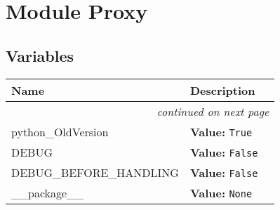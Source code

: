 %
%
%


\section{Module Proxy}

    \label{Proxy}


  \subsection{Variables}

    \vspace{-1cm}
\hspace{\varindent}\begin{longtable}{|p{\varnamewidth}|p{\vardescrwidth}|l}
\cline{1-2}
\cline{1-2} \centering \textbf{Name} & \centering \textbf{Description}& \\
\cline{1-2}
\endhead\cline{1-2}\multicolumn{3}{r}{\small\textit{continued on next page}}\\\endfoot\cline{1-2}
\endlastfoot\raggedright p\-y\-t\-h\-o\-n\-\_\-O\-l\-d\-V\-e\-r\-s\-i\-o\-n\- & \raggedright \textbf{Value:} 
{\tt True}&\\
\cline{1-2}
\raggedright D\-E\-B\-U\-G\- & \raggedright \textbf{Value:} 
{\tt False}&\\
\cline{1-2}
\raggedright D\-E\-B\-U\-G\-\_\-B\-E\-F\-O\-R\-E\-\_\-H\-A\-N\-D\-L\-I\-N\-G\- & \raggedright \textbf{Value:} 
{\tt False}&\\
\cline{1-2}
\raggedright \_\-\_\-p\-a\-c\-k\-a\-g\-e\-\_\-\_\- & \raggedright \textbf{Value:} 
{\tt None}&\\
\cline{1-2}
\end{longtable}



